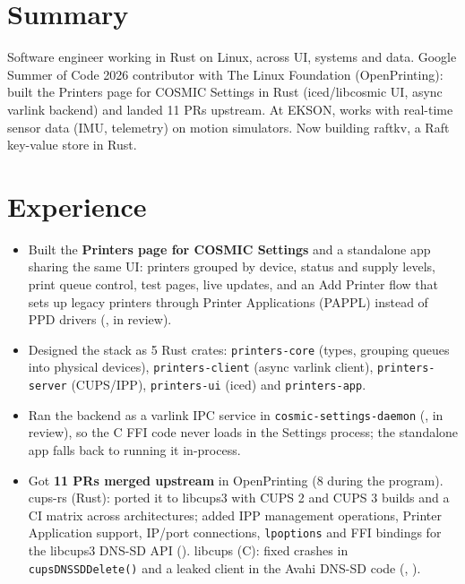 \documentclass[10pt]{article}
\begin{document}

\section*{Summary}
Software engineer working in Rust on Linux, across UI, systems and data. Google Summer of Code 2026 contributor with The Linux Foundation (OpenPrinting): built the Printers page for COSMIC Settings in Rust (iced/libcosmic UI, async varlink backend) and landed 11 PRs upstream. At EKSON, works with real-time sensor data (IMU, telemetry) on motion simulators. Now building raftkv, a Raft key-value store in Rust.

\section*{Experience}
\begin{itemize}
  \item Built the \textbf{Printers page for COSMIC Settings} and a standalone app sharing the same UI: printers grouped by device, status and supply levels, print queue control, test pages, live updates, and an Add Printer flow that sets up legacy printers through Printer Applications (PAPPL) instead of PPD drivers (, in review).
  \item Designed the stack as 5 Rust crates: \texttt{printers-core} (types, grouping queues into physical devices), \texttt{printers-client} (async varlink client), \texttt{printers-server} (CUPS/IPP), \texttt{printers-ui} (iced) and \texttt{printers-app}.
  \item Ran the backend as a varlink IPC service in \texttt{cosmic-settings-daemon} (, in review), so the C FFI code never loads in the Settings process; the standalone app falls back to running it in-process.
  \item Got \textbf{11 PRs merged upstream} in OpenPrinting (8 during the program). cups-rs (Rust): ported it to libcups3 with CUPS 2 and CUPS 3 builds and a CI matrix across architectures; added IPP management operations, Printer Application support, IP/port connections, \texttt{lpoptions} and FFI bindings for the libcups3 DNS-SD API (). libcups (C): fixed crashes in \texttt{cupsDNSSDDelete()} and a leaked client in the Avahi DNS-SD code (, ).
\end{itemize}
\end{document}
